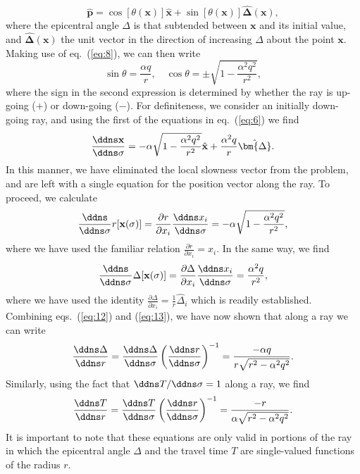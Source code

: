 \begin{equation}
\hat{\mathbf{p}}=\cos[\theta(\mathbf{x})]\hat{\mathbf{x}}+\sin[\theta(\mathbf{x})]\hat{\bm{\Delta}}(\mathbf{x}),
\label{eq:9}
\end{equation}
where the epicentral angle $\Delta$ is that subtended between $\mathbf{x}$ and its initial value, and $\hat{\bm{\Delta}}(\mathbf{x})$ the unit vector in the direction of increasing $\Delta$ about the point $\mathbf{x}$.
Making use of eq.~(\ref{eq:8}), we can then write
\begin{equation}
\sin \theta=\frac{\alpha q}{r},\quad \cos \theta=\pm\sqrt{1-\frac{\alpha^{2}q^{2}}{r^{2}}},
\label{eq:10}
\end{equation}
where the sign in the second expression is determined by whether the ray is up-going ($+$) or down-going ($-$). For definiteness, we consider an initially down-going ray, and using the first of the equations in eq.~(\ref{eq:6}) we find
\begin{equation}
\frac{\ddns \mathbf{x}}{\ddns \sigma}=-\alpha\sqrt{1-\frac{\alpha^{2}q^{2}}{r^{2}}}\hat{\mathbf{x}}+\frac{\alpha^{2}q}{r}\hat{\bm{\Delta}}.
\label{eq:11}
\end{equation}
In this manner, we have eliminated the local slowness vector from the problem, and are left with a single equation for the position vector along the ray. To proceed, we calculate
\begin{equation}
\frac{\ddns }{\ddns \sigma}r[\mathbf{x}(\sigma)]=\frac{\partial r}{\partial x_{i}}\frac{\ddns x_{i}}{\ddns\sigma}=-\alpha\sqrt{1-\frac{\alpha^{2}q^{2}}{r^{2}}},
\label{eq:12}
\end{equation}
where we have used the familiar relation $\frac{\partial r}{\partial x_{i}}=\hat{x}_{i}$. In the same way, we find
\begin{equation}
\frac{\ddns }{\ddns \sigma}\Delta[\mathbf{x}(\sigma)]=\frac{\partial\Delta}{\partial x_{i}}\frac{\ddns x_{i}}{\ddns \sigma}=\frac{\alpha^{2}q}{r^{2}},
\label{eq:13}
\end{equation}
where we have used the identity $\frac{\partial\Delta}{\partial x_{i}}=\frac{1}{r}\hat{\Delta}_{i}$ which is readily established. Combining eqs.~(\ref{eq:12}) and (\ref{eq:13}), we have now shown that along a ray we can write
\begin{equation}
\frac{\ddns \Delta}{\ddns r}=\frac{\ddns \Delta}{\ddns\sigma}\left(\frac{\ddns r}{\ddns \sigma}\right)^{-1}=\frac{-\alpha q}{r\sqrt{r^{2}-\alpha^{2}q^{2}}}.
\label{eq:14}
\end{equation}
Similarly, using the fact that $\ddns T/\ddns \sigma=1$ along a ray, we find
\begin{equation}
\frac{\ddns T}{\ddns r}=\frac{\ddns T}{\ddns \sigma}\left(\frac{\ddns r}{\ddns \sigma}\right)^{-1}=\frac{-r}{\alpha\sqrt{r^{2}-\alpha^{2}q^{2}}}.
\label{eq:15}
\end{equation}
It is important to note that these equations are only valid in portions of the ray in which the epicentral angle $\Delta$ and the travel time $T$ are single-valued functions of the radius $r$.

